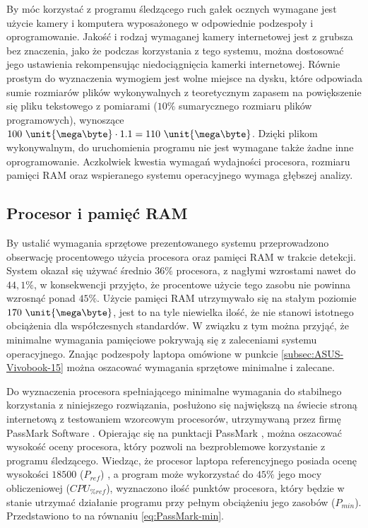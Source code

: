 \documentclass[a4paper,twoside,12pt]{book}
\begin{document}
By móc korzystać z programu śledzącego ruch gałek ocznych wymagane jest użycie kamery i komputera wyposażonego w odpowiednie podzespoły i oprogramowanie. Jakość i rodzaj wymaganej kamery internetowej jest z grubsza bez znaczenia, jako że podczas korzystania z tego systemu, można dostosować jego ustawienia rekompensując niedociągnięcia kamerki internetowej. Równie prostym do wyznaczenia wymogiem jest wolne miejsce na dysku, które odpowiada sumie rozmiarów plików wykonywalnych z teoretycznym zapasem na powiększenie się pliku tekstowego z pomiarami ($10\%$ sumarycznego rozmiaru plików programowych), wynoszące $100 \ \unit{\mega\byte} \cdot 1.1 = 110 \ \unit{\mega\byte}$. Dzięki plikom wykonywalnym, do uruchomienia programu nie jest wymagane także żadne inne oprogramowanie. Aczkolwiek kwestia wymagań wydajności procesora, rozmiaru pamięci RAM oraz wspieranego systemu operacyjnego wymaga głębszej analizy.

\subsection{Procesor i pamięć RAM}
\label{subsec:Procesor-i-pamięć-RAM}

By ustalić wymagania sprzętowe prezentowanego systemu przeprowadzono obserwację procentowego użycia procesora oraz pamięci RAM w trakcie detekcji. System okazał się używać średnio $36\%$ procesora, z nagłymi wzrostami nawet do $44,1\%$, w konsekwencji przyjęto, że procentowe użycie tego zasobu nie powinna wzrosnąć ponad $45\%$. Użycie pamięci RAM utrzymywało się na stałym poziomie $170 \ \unit{\mega\byte}$, jest to na tyle niewielka ilość, że nie stanowi istotnego obciążenia dla współczesnych standardów. W związku z tym można przyjąć, że minimalne wymagania pamięciowe pokrywają się z zaleceniami systemu operacyjnego. Znając podzespoły laptopa omówione w punkcie \ref{subsec:ASUS-Vivobook-15} można oszacować wymagania sprzętowe minimalne i zalecane.

Do wyznaczenia procesora spełniającego minimalne wymagania do stabilnego korzystania z niniejszego rozwiązania, posłużono się największą na świecie stroną internetową z testowaniem wzorcowym procesorów, utrzymywaną przez firmę PassMark Software \cite{bib:PassMark-about-us}. Opierając się na punktacji PassMark \cite{bib:PassMark-test}, można oszacować wysokość oceny procesora, który pozwoli na bezproblemowe korzystanie z programu śledzącego. Wiedząc, że procesor laptopa referencyjnego posiada ocenę wysokości $18500$ ($P_{ref}$) \cite{bib:moj-procesor-benchmark}, a program może wykorzystać do $45\%$ jego mocy obliczeniowej ($CPU_{\%ref}$), wyznaczono ilość punktów procesora, który będzie w stanie utrzymać działanie programu przy pełnym obciążeniu jego zasobów ($P_{min}$). Przedstawiono to na równaniu \ref{eq:PassMark-min}.
\end{document}
